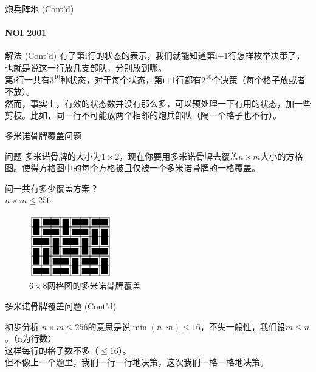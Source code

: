 \documentclass[hyperref={unicode=true}]{beamer}
\theoremstyle{definition}
\theoremstyle{proof}
\begin{document}
\begin{frame}{炮兵阵地 (Cont'd)}\framesubtitle{NOI 2001}
  \begin{exampleblock}{解法 (Cont'd)}
    有了第i行的状态的表示，我们就能知道第i+1行怎样枚举决策了，也就是说这一行放几支部队，分别放到哪。\\
    \pause{}第i行一共有$3^{10}$种状态，对于每个状态，第i+1行都有$2^{10}$个决策（每个格子放或者不放）。\\
    然而，事实上，有效的状态数并没有那么多，可以预处理一下有用的状态，加一些剪枝。比如，同一行不可能放两个相邻的炮兵部队（隔一个格子也不行）。
  \end{exampleblock}
\end{frame}

\begin{frame}{多米诺骨牌覆盖问题}
  \begin{block}{问题}
    多米诺骨牌的大小为$1\times 2$，现在你要用多米诺骨牌去覆盖$n\times m$大小的方格图。使得方格图中的每个方格被且仅被一个多米诺骨牌的一格覆盖。\\
    \begin{minipage}{0.45\linewidth}
      问一共有多少覆盖方案？\\
      $n \times m \leq 256$
    \end{minipage}
    \begin{minipage}{0.45\linewidth}
      \begin{figure}
        \centering
        \includegraphics[width=1.4in]{figures/domino.png}
        \caption{$6\times 8$网格图的多米诺骨牌覆盖}
      \end{figure}
    \end{minipage}
  \end{block}
\end{frame}

\begin{frame}{多米诺骨牌覆盖问题 (Cont'd)}
  \begin{alertblock}{初步分析}
    $n \times m \leq 256$的意思是说$\min{(n,m)} \leq 16$，不失一般性，我们设$m\leq n$。（n为行数）\\
    这样每行的格子数不多（$\leq 16$）。\\
    但不像上一个题里，我们一行一行地决策，这次我们一格一格地决策。
  \end{alertblock}
\end{frame}
\end{document}
